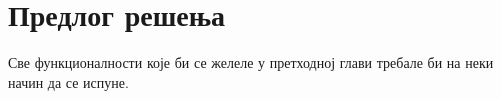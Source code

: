 \chapter{Предлог решења} \label{ModelProposal}
Све функционалности које би се желеле у претходној глави требале би на неки начин да се испуне.